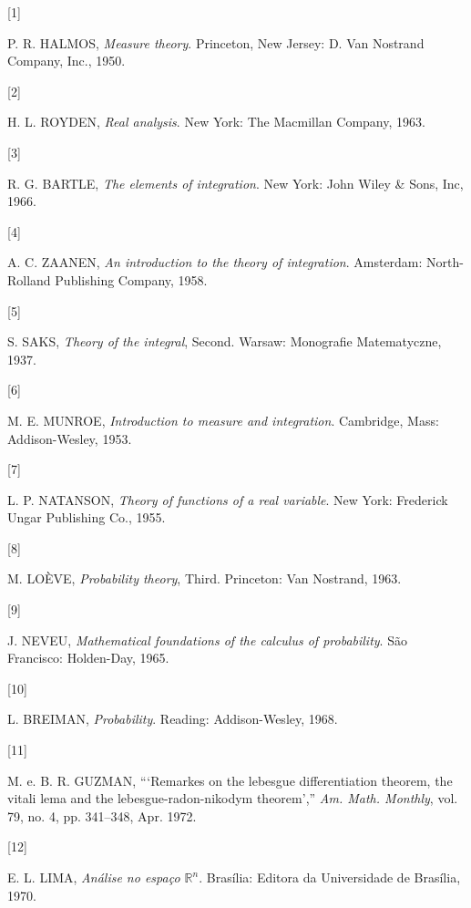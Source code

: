\documentclass[
]{book}
\newlength{\cslhangindent}
\newlength{\csllabelwidth}
\newenvironment{CSLReferences}[2] %
 {\begin{list}{}{%
  \setlength{\itemindent}{0pt}
  \setlength{\leftmargin}{0pt}
  \setlength{\parsep}{0pt}
  \ifodd #1
   \setlength{\leftmargin}{\cslhangindent}
   \setlength{\itemindent}{-1\cslhangindent}
  \fi
  \setlength{\itemsep}{#2\baselineskip}}}
 {\end{list}}
\newcommand{\CSLLeftMargin}[1]{\parbox[t]{\csllabelwidth}{\strut#1\strut}}
\newcommand{\CSLRightInline}[1]{\parbox[t]{\linewidth - \csllabelwidth}{\strut#1\strut}}
\begin{document}
\label{refs}
\begin{CSLReferences}{0}{0}
\CSLLeftMargin{{[}1{]} }%
\CSLRightInline{P. R. HALMOS, \emph{Measure theory}. Princeton, New Jersey: D. Van Nostrand Company, Inc., 1950.}

\CSLLeftMargin{{[}2{]} }%
\CSLRightInline{H. L. ROYDEN, \emph{Real analysis}. New York: The Macmillan Company, 1963.}

\CSLLeftMargin{{[}3{]} }%
\CSLRightInline{R. G. BARTLE, \emph{The elements of integration}. New York: John Wiley \& Sons, Inc, 1966.}

\CSLLeftMargin{{[}4{]} }%
\CSLRightInline{A. C. ZAANEN, \emph{An introduction to the theory of integration}. Amsterdam: North-Rolland Publishing Company, 1958.}

\CSLLeftMargin{{[}5{]} }%
\CSLRightInline{S. SAKS, \emph{Theory of the integral}, Second. Warsaw: Monografie Matematyczne, 1937.}

\CSLLeftMargin{{[}6{]} }%
\CSLRightInline{M. E. MUNROE, \emph{Introduction to measure and integration}. Cambridge, Mass: Addison-Wesley, 1953.}

\CSLLeftMargin{{[}7{]} }%
\CSLRightInline{L. P. NATANSON, \emph{Theory of functions of a real variable}. New York: Frederick Ungar Publishing Co., 1955.}

\CSLLeftMargin{{[}8{]} }%
\CSLRightInline{M. LOÈVE, \emph{Probability theory}, Third. Princeton: Van Nostrand, 1963.}

\CSLLeftMargin{{[}9{]} }%
\CSLRightInline{J. NEVEU, \emph{Mathematical foundations of the calculus of probability}. São Francisco: Holden-Day, 1965.}

\CSLLeftMargin{{[}10{]} }%
\CSLRightInline{L. BREIMAN, \emph{Probability}. Reading: Addison-Wesley, 1968.}

\CSLLeftMargin{{[}11{]} }%
\CSLRightInline{M. e. B. R. GUZMAN, {``{`Remarkes on the lebesgue differentiation theorem, the vitali lema and the lebesgue-radon-nikodym theorem'},''} \emph{Am. Math. Monthly}, vol. 79, no. 4, pp. 341--348, Apr. 1972.}

\CSLLeftMargin{{[}12{]} }%
\CSLRightInline{E. L. LIMA, \emph{Análise no espaço \(\mathbb{R}^n\)}. Brasília: Editora da Universidade de Brasília, 1970.}


\end{CSLReferences}
\end{document}
